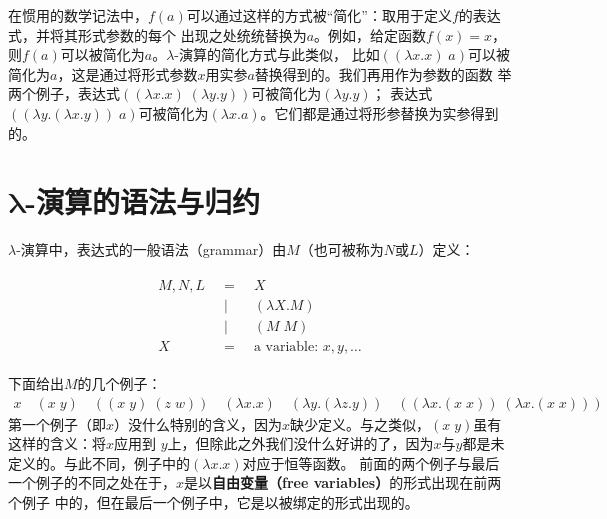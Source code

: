 \documentclass[12pt]{article}
\begin{document}
\indent{}在惯用的数学记法中，$f(a)$可以通过这样的方式被“简化”：取用于定义$f$的表达式，并将其形式参数的每个
出现之处统统替换为$a$。例如，给定函数$f(x)=x$，则$f(a)$可以被简化为$a$。$\lambda$-演算的简化方式与此类似，
比如$((\lambda x.x)\;a)$可以被简化为$a$，这是通过将形式参数$x$用实参$a$替换得到的。我们再用作为参数的函数
举两个例子，表达式$((\lambda x.x) \;(\lambda y.y))$可被简化为$(\lambda y.y)$；
表达式$((\lambda y.(\lambda x.y))\;a)$可被简化为$(\lambda x.a)$。它们都是通过将形参替换为实参得到的。
\clearpage

\section{$\boldsymbol{\lambda}$-演算的语法与归约}
\indent{}$\lambda$-演算中，表达式的一般语法（grammar）由$M$（也可被称为$N$或$L$）定义：
\begin{tcolorbox}[top=-0.8em,left=0mm,right=0mm]
\begin{gather*}
\begin{array}{lcl}
M,N,L\;\; & = & \;\;X\\
          & | & \;\;(\lambda X.M)\\
          & | & \;\;(M\;M)\\
X\;\;     & = & \;\;\textrm{a variable: }x,y,\ldots
\end{array}
\end{gather*}
\end{tcolorbox}
\noindent{}下面给出$M$的几个例子：
\begin{gather*}
x \quad (x\;y) \quad ((x\;y)\;(z\;w)) \quad (\lambda x.x) \quad (\lambda y.(\lambda z.y)) \quad%
((\lambda x.(x\;x))\;(\lambda x.(x\;x)))
\end{gather*}
\noindent{}第一个例子（即$x$）没什么特别的含义，因为$x$缺少定义。与之类似，$(x\;y)$虽有这样的含义：将$x$应用到
$y$上，但除此之外我们没什么好讲的了，因为$x$与$y$都是未定义的。与此不同，例子中的$(\lambda x.x)$对应于恒等函数。
前面的两个例子与最后一个例子的不同之处在于，$x$是以\textbf{自由变量（free variables）}的形式出现在前两个例子
中的，但在最后一个例子中，它是以被绑定的形式出现的。
\end{document}
